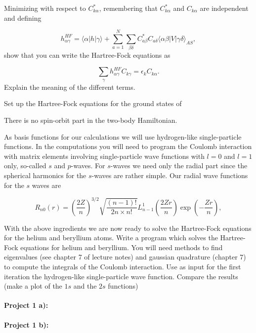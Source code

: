 \documentclass[%
oneside,                 %
final,                   %
10pt]{article}
\begin{document}
Minimizing with respect to $C^*_{k\alpha}$, remembering that $C^*_{k\alpha}$ and $C_{k\alpha}$
are independent and defining

\begin{equation*}
h_{\alpha\gamma}^{HF}=\langle \alpha | h | \gamma \rangle+
\sum_{a=1}^N\sum_{\beta\delta} C^*_{a\beta}C_{a\delta}\langle \alpha\beta|V|\gamma\delta\rangle_{AS},
\end{equation*}
show that you can write the Hartree-Fock  equations as

\begin{equation*}
\sum_{\gamma}h_{\alpha\gamma}^{HF}C_{k\gamma}=\epsilon_kC_{k\alpha}.
\label{eq:newhf}
\end{equation*}
Explain the meaning of the different terms.

Set up the Hartree-Fock equations for the ground states of 

There is no spin-orbit part in the two-body Hamiltonian.

As basis functions for our calculations we will use hydrogen-like single-particle functions. 
In the computations you will need to program the Coulomb interaction with matrix elements
involving single-particle wave functions with $l=0$ and $l=1$ only, so-called $s$ and $p$-waves.
For $s$-waves we need only the radial part since the 
spherical harmonics for the $s$-waves are rather simple.
Our radial wave functions for the $s$ waves are

\begin{equation*}
R_{n0}(r)=\left(\frac{2Z}{n}\right)^{3/2}\sqrt{\frac{(n-1)!}{2n\times n!}}L_{n-1}^1(\frac{2Zr}{n})\exp{(-\frac{Zr}{n})},
\end{equation*}


With the above ingredients we are now ready to solve 
the Hartree-Fock equations  for the helium and beryllium atoms.  
Write a program which solves the Hartree-Fock equations for helium and beryllium.
You will need methods to find eigenvalues (see chapter 7 of lecture notes) and
gaussian quadrature (chapter 7) to compute the integrals of the Coulomb interaction.
Use as input for the first 
iteration the hydrogen-like single-particle wave function.
Compare the results (make a plot of the $1s$ and the $2s$ functions) 


\paragraph{Project 1 a):}
\paragraph{Project 1 b):}
\end{document}
